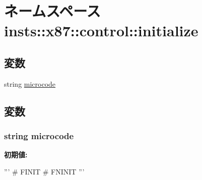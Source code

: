 \hypertarget{namespaceinsts_1_1x87_1_1control_1_1initialize}{
\section{ネームスペース insts::x87::control::initialize}
\label{namespaceinsts_1_1x87_1_1control_1_1initialize}
}
\subsection*{変数}
\begin{DoxyCompactItemize}
\item 
string \hyperlink{namespaceinsts_1_1x87_1_1control_1_1initialize_a770f11a173e99389a8802f0107ed8f52}{microcode}
\end{DoxyCompactItemize}


\subsection{変数}
\hypertarget{namespaceinsts_1_1x87_1_1control_1_1initialize_a770f11a173e99389a8802f0107ed8f52}{
\subsubsection[{microcode}]{\setlength{\rightskip}{0pt plus 5cm}string {\bf microcode}}}
\label{namespaceinsts_1_1x87_1_1control_1_1initialize_a770f11a173e99389a8802f0107ed8f52}
{\bfseries 初期値:}
\begin{DoxyCode}
'''
# FINIT
# FNINIT
'''
\end{DoxyCode}

